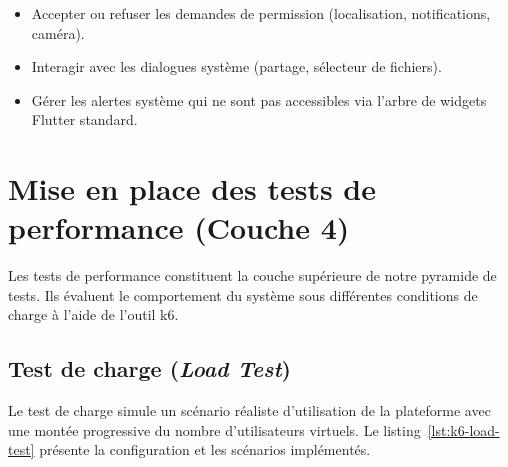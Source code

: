 \begin{itemize}
  \item Accepter ou refuser les demandes de permission (localisation, notifications,
        caméra).
  \item Interagir avec les dialogues système (partage, sélecteur de fichiers).
  \item Gérer les alertes système qui ne sont pas accessibles via l'arbre de widgets
        Flutter standard.
\end{itemize}

\section{Mise en place des tests de performance (Couche 4)}
\label{sec:tests-performance}

Les tests de performance constituent la couche supérieure de notre pyramide de tests.
Ils évaluent le comportement du système sous différentes conditions de charge à l'aide
de l'outil k6.

\subsection{Test de charge (\textit{Load Test})}
\label{subsec:test-charge}

Le test de charge simule un scénario réaliste d'utilisation de la plateforme avec une
montée progressive du nombre d'utilisateurs virtuels. Le listing~\ref{lst:k6-load-test}
présente la configuration et les scénarios implémentés.

